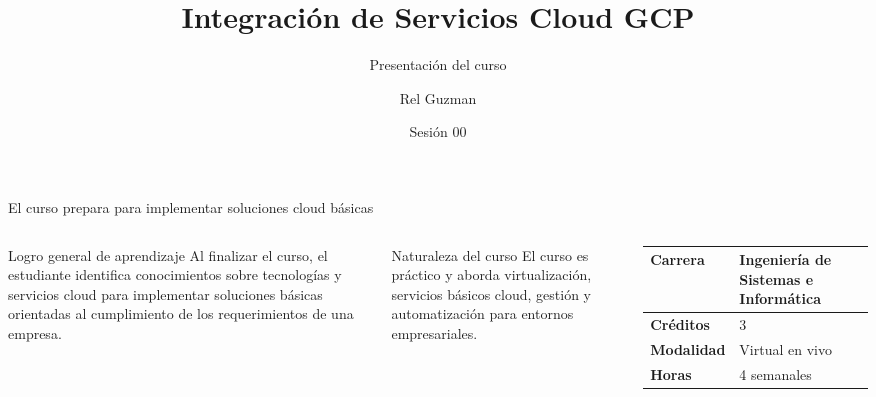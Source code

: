 \documentclass[aspectratio=169,10pt,c]{beamer}
\title{Integración de Servicios Cloud GCP}
\subtitle{Presentación del curso}
\date{Sesión 00}
\author{Rel Guzman}
\begin{document}
{\maketitle}

\begin{frame}{El curso prepara para implementar soluciones cloud básicas}
\begin{columns}[c,onlytextwidth]
\begin{block}{Logro general de aprendizaje}
\small Al finalizar el curso, el estudiante identifica conocimientos sobre tecnologías y servicios cloud para implementar soluciones básicas orientadas al cumplimiento de los requerimientos de una empresa.
\end{block}
\begin{exampleblock}{Naturaleza del curso}
\small El curso es práctico y aborda virtualización, servicios básicos cloud, gestión y automatización para entornos empresariales.
\end{exampleblock}
\small
\begin{tabular}{>{\bfseries}p{1.65cm}p{3.0cm}}
\toprule
Carrera & Ingeniería de Sistemas e Informática\\
\midrule
Créditos & 3\\
Modalidad & Virtual en vivo\\
Horas & 4 semanales\\
\bottomrule
\end{tabular}
\end{columns}
\end{frame}
\end{document}
